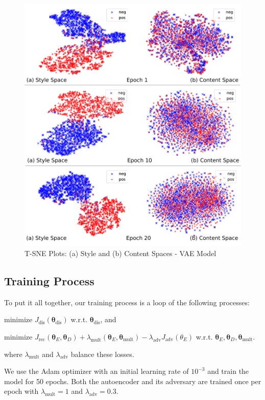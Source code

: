 \documentclass[11pt,a4paper]{article}
\begin{document}
\begin{figure}[ht]
	\includegraphics[width=\linewidth]{latent-spaces-vae}
	\caption{T-SNE Plots: (a) Style and (b) Content Spaces - VAE Model}
	\label{fig:vae-tsne}
\end{figure}

\subsection{Training Process}

To put it all together, our training process is a loop of the following processes:
\begin{compactenum}
	\item minimize $J_\text{dis}(\bm\theta_\text{dis})$ w.r.t. $\bm\theta_\text{dis}$, and
	\item minimize $J_\text{rec}(\bm\theta_E, \bm\theta_D) + \lambda_\text{mult}(\bm\theta_E,\bm\theta_\text{mult}) -\lambda_\text{adv}
		J_\text{adv}(\theta_E)$ w.r.t. $\bm\theta_E, \bm\theta_D, \bm\theta_\text{mult}$.
\end{compactenum}
where $\lambda_\text{mult}$ and $\lambda_\text{adv}$ balance these losses.

We use the Adam optimizer \cite{kingma2014adam} with an initial learning rate of $10^{-3}$ and train the model for 50 epochs. Both the autoencoder and its adversary are trained once per epoch with $\lambda_\text{mult} = 1$ and $\lambda_\text{adv} = 0.3$.
\end{document}
